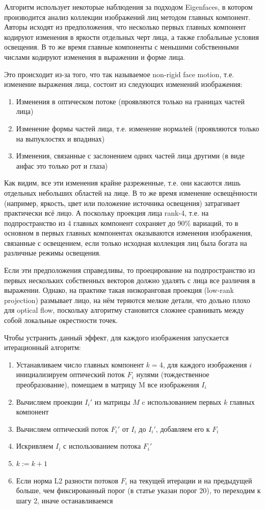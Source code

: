 Алгоритм использует некоторые наблюдения за подходом Eigenfaces, в котором производится анализ коллекции изображений лиц методом главных компонент. Авторы исходят из предположения, что несколько первых главных компонент кодируют изменения в яркости отдельных черт лица, а также глобальные условия освещения. В то же время главные компоненты с меньшими собственными числами кодируют изменения в выражении и форме лица.

Это происходит из-за того, что так называемое non-rigid face motion, т.е. изменение выражения лица, состоит из следующих изменений изображения:

\begin{enumerate}
  \item Изменения в оптическом потоке (проявляются только на границах частей лица)
  \item Изменение формы частей лица, т.е. изменение нормалей (проявляются только на выпуклостях и впадинах)
  \item Изменения, связанные с заслонением одних частей лица другими (в виде анфас это только рот и глаза)
\end{enumerate}

Как видим, все эти изменения крайне разреженные, т.е. они касаются лишь отдельных небольших областей на лице. В то же время изменение освещённости (например, яркость, цвет или положение источника освещения) затрагивает практически всё лицо. А поскольку проекция лица rank-4, т.е. на подпространство из 4 главных компонент сохраняет до 90\% вариаций, то в основном в первых главных компонентах оказываются изменения изображения, связанные с освещением, если только исходная коллекция лиц была богата на различные режимы освещения.

Если эти предположения справедливы, то проецирование на подпространство из первых нескольких собственных векторов должно удалять с лица все различия в выражении. Однако, на практике такая низкоранговая проекция (low-rank projection) размывает лицо, на нём теряются мелкие детали, что дольно плохо для optical flow, поскольку алгоритму становится сложнее сравнивать между собой локальные окрестности точек.

Чтобы устранить данный эффект, для каждого изображения запускается итерационный алгоритм:
\begin{enumerate}
  \item Устанавливаем число главных компонент $ k = 4 $, для каждого изображения $ i $ инициализируем оптический поток $ F_i $ нулями (тождественное преобразование), помещаем в матрицу M все изображения $ I_i $
  \item Вычисляем проекции $ I_i' $ из матрицы $M$ c использованием первых $k$ главных компонент
  \item Вычисляем оптический поток $ F_i' $ от $I_i$ до $I_i'$, добавляем его к $ F_i $
  \item Искривляем $ I_i $ с использованием потока $ F_i' $
  \item $ k := k + 1 $
  \item Если норма L2 разности потоков $ F_i $ на текущей итерации и на предыдущей больше, чем фиксированный порог (в статье указан порог 20), то переходим к шагу 2, иначе останавливаемся
\end{enumerate}

